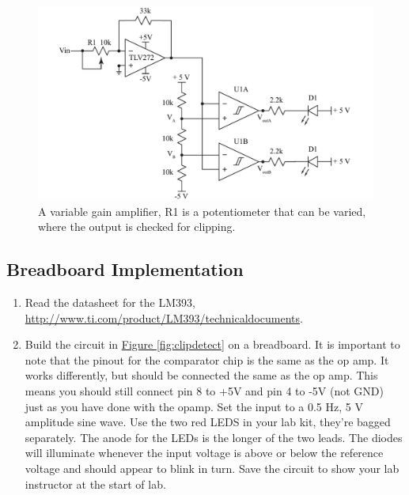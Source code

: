 \begin{figure}[h] 
	\centering
	\includegraphics[width=1\textwidth]{lab6vga.pdf}
	\caption{A variable gain amplifier, R1 is a potentiometer that can be varied, where the output is checked for clipping.} \label{fig:vga}
\end{figure}


\subsection{Breadboard Implementation} \label{ssec:6breadboard}

\begin{enumerate}
\item Read the datasheet for the LM393, \url{http://www.ti.com/product/LM393/technicaldocuments}. 
\item Build the circuit in \hyperref[fig:clipdetect]{Figure \ref*{fig:clipdetect}} on a breadboard. It is important to note that the pinout for the comparator chip is the same as the op amp. It works differently, but should be connected the same as the op amp. This means you should still connect pin 8 to +5V and pin 4 to -5V (not GND) just as you have done with the opamp.  Set the input to a 0.5 Hz, 5 V amplitude sine wave. Use the two red LEDS in your lab kit, they're bagged separately. The anode for the LEDs is the longer of the two leads. The diodes will illuminate whenever the input voltage is above or below the reference voltage and should appear to blink in turn. Save the circuit to show your lab instructor at the start of lab. \label{itm:8ssec2itm1}
\end{enumerate}

